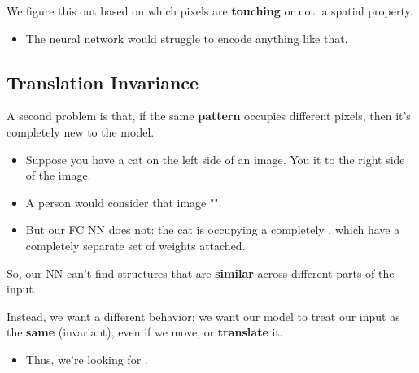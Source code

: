         We figure this out based on which pixels are \textbf{touching} or not: a spatial property.

        \begin{itemize}
            \item The neural network would struggle to encode anything like that.
        \end{itemize}

        



        

        

    \subsection{Translation Invariance}

        A second problem is that, if the same \textbf{pattern} occupies different pixels, then it's completely new to the model.

        \begin{itemize}
            \item \miniex Suppose you have a cat on the left side of an image. You  it to the right side of the image.
            \item A person would consider that image "".
            \item But our FC NN does not: the cat is occupying a completely , which have a completely separate set of weights attached.
        \end{itemize}

        So, our NN can't find structures that are \textbf{similar} across different parts of the input.

        Instead, we want a different behavior: we want our model to treat our input as the \textbf{same} (invariant), even if we move, or \textbf{translate} it.

        \begin{itemize}
            \item Thus, we're looking for .\\
        \end{itemize}

